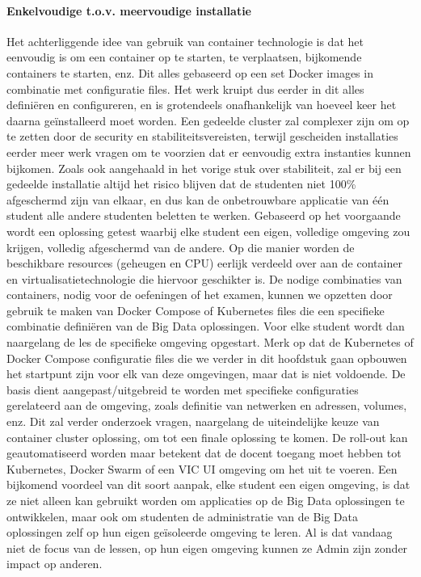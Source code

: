 \paragraph{Enkelvoudige t.o.v. meervoudige installatie}
Het achterliggende idee van gebruik van container technologie is dat het eenvoudig is om een container op te starten, te verplaatsen, bijkomende containers te starten, enz. Dit alles gebaseerd op een set Docker images in combinatie met configuratie files.
\newline
Het werk kruipt dus eerder in dit alles definiëren en configureren, en is grotendeels onafhankelijk van hoeveel keer het daarna geïnstalleerd moet worden. Een gedeelde cluster zal complexer zijn om op te zetten door de security en stabiliteitsvereisten, terwijl gescheiden installaties eerder meer werk vragen om te voorzien dat er eenvoudig extra instanties kunnen bijkomen.
\newline
Zoals ook aangehaald in het vorige stuk over stabiliteit, zal er bij een gedeelde installatie altijd het risico blijven dat de studenten niet 100\% afgeschermd zijn van elkaar, en dus kan de onbetrouwbare applicatie van \'e\'en student alle andere studenten beletten te werken.
\newline
\newline
\newline
Gebaseerd op het voorgaande wordt een oplossing getest waarbij elke student een eigen, volledige omgeving zou krijgen, volledig afgeschermd van de andere. Op die manier worden de beschikbare resources (geheugen en CPU) eerlijk verdeeld over aan de container en virtualisatietechnologie die hiervoor geschikter is.
\newline
De nodige combinaties van containers, nodig voor de oefeningen of het examen, kunnen we opzetten door gebruik te maken van Docker Compose of Kubernetes files die een specifieke combinatie definiëren van de Big Data oplossingen. Voor elke student wordt dan naargelang de les de specifieke omgeving opgestart.
\newline
Merk op dat de Kubernetes of Docker Compose configuratie files die we verder in dit hoofdstuk gaan opbouwen het startpunt zijn voor elk van deze omgevingen, maar dat is niet voldoende. De basis dient aangepast/uitgebreid te worden met specifieke configuraties gerelateerd aan de omgeving, zoals definitie van netwerken en adressen, volumes, enz. Dit zal verder onderzoek vragen, naargelang de uiteindelijke keuze van container cluster oplossing, om tot een finale oplossing te komen.
\newline
De roll-out kan geautomatiseerd worden maar betekent dat de docent toegang moet hebben tot Kubernetes, Docker Swarm of een VIC UI omgeving om het uit te voeren.
\newline
Een bijkomend voordeel van dit soort aanpak, elke student een eigen omgeving, is dat ze niet alleen kan gebruikt worden om applicaties op de Big Data oplossingen te ontwikkelen, maar ook om studenten de administratie van de Big Data oplossingen zelf op hun eigen geïsoleerde omgeving te leren. Al is dat vandaag niet de focus van de lessen, op hun eigen omgeving kunnen ze Admin zijn zonder impact op anderen.
\newline
\newline


